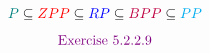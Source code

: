 
\begin{frame}
\end{frame}

\begin{frame}
\end{frame}

\begin{frame}
  {\huge
	\[
	  \textcolor{teal}{P} \subseteq \textcolor{red}{ZPP} \subseteq \textcolor{blue}{RP} \subseteq \textcolor{purple}{BPP} \subseteq \textcolor{cyan}{PP}
	\]
  }

  \pause
  {\LARGE
	\[
	  \textcolor{violet}{\text{Exercise } 5.2.2.9}
	\]
  }
\end{frame}
